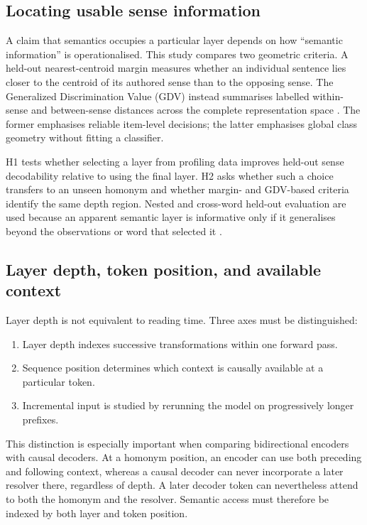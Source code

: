 \documentclass[conference]{IEEEtran}
\begin{document}
\subsection{Locating usable sense information}

A claim that semantics occupies a particular layer depends on how
``semantic information'' is operationalised. This study compares two geometric
criteria. A held-out nearest-centroid margin measures whether an individual
sentence lies closer to the centroid of its authored sense than to the opposing
sense. The Generalized Discrimination Value (GDV) instead summarises labelled
within-sense and between-sense distances across the complete representation
space \citep{schilling2021}. The former emphasises reliable item-level
decisions; the latter emphasises global class geometry without fitting a
classifier.

H1 tests whether selecting a layer from profiling data improves held-out
sense decodability relative to using the final layer. H2 asks whether such a
choice transfers to an unseen homonym and whether margin- and GDV-based
criteria identify the same depth region. Nested and cross-word held-out
evaluation are used because an apparent semantic layer is informative only if
it generalises beyond the observations or word that selected it
\citep{hewitt2019}.

\subsection{Layer depth, token position, and available context}

Layer depth is not equivalent to reading time. Three axes must be distinguished:

\begin{enumerate}
  \item Layer depth indexes successive transformations within one forward pass.
  \item Sequence position determines which context is causally available at a
        particular token.
  \item Incremental input is studied by rerunning the model on progressively
        longer prefixes.
\end{enumerate}

This distinction is especially important when comparing bidirectional encoders
with causal decoders. At a homonym position, an encoder can use both preceding
and following context, whereas a causal decoder can never incorporate a later
resolver there, regardless of depth. A later decoder token can nevertheless
attend to both the homonym and the resolver. Semantic access must therefore be
indexed by both layer and token position.
\end{document}

